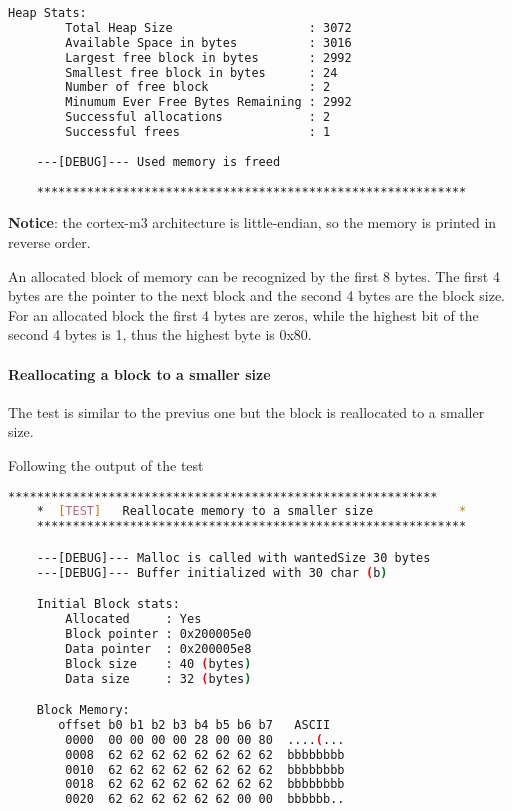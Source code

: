     \begin{outputbox}
    \begin{lstlisting}[language=bash]
    Heap Stats:
        Total Heap Size                   : 3072
        Available Space in bytes          : 3016
        Largest free block in bytes       : 2992
        Smallest free block in bytes      : 24
        Number of free block              : 2
        Minumum Ever Free Bytes Remaining : 2992
        Successful allocations            : 2
        Successful frees                  : 1
    
    ---[DEBUG]--- Used memory is freed
    
    ************************************************************
    \end{lstlisting}
    \end{outputbox}

    \textbf{Notice}: the cortex-m3 architecture is little-endian, so the memory is printed in reverse order.

    An allocated block of memory can be recognized by the first 8 bytes. The first 4 bytes are the pointer to the next block and the second 4 bytes are the block size. For an allocated block the first 4 bytes are zeros, while the highest bit of the second 4 bytes is 1, thus the highest byte is 0x80.

    \paragraph{Reallocating a block to a smaller size}
    The test is similar to the previus one but the block is reallocated to a smaller size.

    Following the output of the test

    \begin{outputbox}
    \begin{lstlisting}[language=bash]
    ************************************************************
    *  [TEST]   Reallocate memory to a smaller size            *
    ************************************************************

    ---[DEBUG]--- Malloc is called with wantedSize 30 bytes
    ---[DEBUG]--- Buffer initialized with 30 char (b)

    Initial Block stats:
        Allocated     : Yes
        Block pointer : 0x200005e0
        Data pointer  : 0x200005e8
        Block size    : 40 (bytes)
        Data size     : 32 (bytes)

    Block Memory:
       offset b0 b1 b2 b3 b4 b5 b6 b7   ASCII
        0000  00 00 00 00 28 00 00 80  ....(...
        0008  62 62 62 62 62 62 62 62  bbbbbbbb
        0010  62 62 62 62 62 62 62 62  bbbbbbbb
        0018  62 62 62 62 62 62 62 62  bbbbbbbb
        0020  62 62 62 62 62 62 00 00  bbbbbb..
    \end{lstlisting}
    \end{outputbox}

